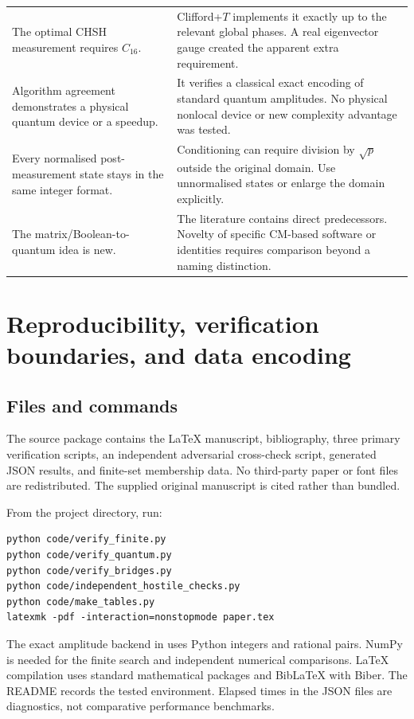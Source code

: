\begin{longtable}{@{}L{0.31\textwidth}L{0.62\textwidth}@{}}
The optimal CHSH measurement requires $C_{16}$. & Clifford+$T$ implements it exactly up to the relevant global phases. A real eigenvector gauge created the apparent extra requirement.\\
Algorithm agreement demonstrates a physical quantum device or a speedup. & It verifies a classical exact encoding of standard quantum amplitudes. No physical nonlocal device or new complexity advantage was tested.\\
Every normalised post-measurement state stays in the same integer format. & Conditioning can require division by $\sqrt p$ outside the original domain. Use unnormalised states or enlarge the domain explicitly.\\
The matrix/Boolean-to-quantum idea is new. & The literature contains direct predecessors. Novelty of specific CM-based software or identities requires comparison beyond a naming distinction.\\
\bottomrule
\end{longtable}
\endgroup

\section{Reproducibility, verification boundaries, and data encoding}\label{app:repro}
\subsection{Files and commands}
The source package contains the LaTeX manuscript, bibliography, three primary verification scripts, an independent adversarial cross-check script, generated JSON results, and finite-set membership data. No third-party paper or font files are redistributed. The supplied original manuscript is cited rather than bundled.

From the project directory, run:
\begin{verbatim}
python code/verify_finite.py
python code/verify_quantum.py
python code/verify_bridges.py
python code/independent_hostile_checks.py
python code/make_tables.py
latexmk -pdf -interaction=nonstopmode paper.tex
\end{verbatim}
The exact amplitude backend in  uses Python integers and rational pairs. NumPy is needed for the finite search and independent numerical comparisons. LaTeX compilation uses standard mathematical packages and BibLaTeX with Biber. The README records the tested environment. Elapsed times in the JSON files are diagnostics, not comparative performance benchmarks.

